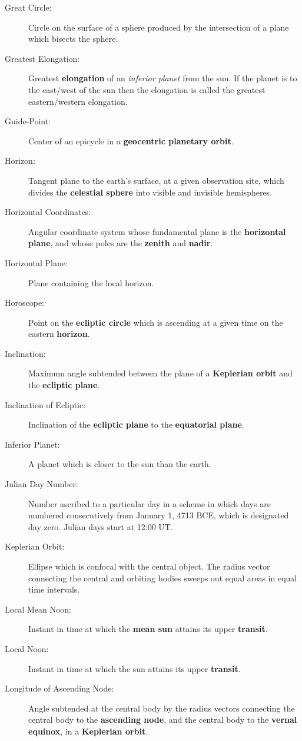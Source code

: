 {\begin{description}
\item [Great Circle:] Circle on the surface of a sphere produced by the intersection of a plane
which bisects the sphere.
\item[Greatest Elongation:] Greatest {\bf elongation}\/ of an {\em inferior planet}\/ from the sun. If the planet is to the east/west of the sun then the
elongation is called the greatest eastern/western elongation. 
\item [Guide-Point:] Center of an epicycle in a {\bf geocentric
planetary orbit}. 
\item [Horizon:] Tangent plane to the earth's surface, at a given
observation site, which divides the {\bf celestial sphere}\/ into
visible and invisible hemispheres. 
\item [Horizontal Coordinates:] Angular coordinate system whose fundamental
plane is the
{\bf horizontal plane}, and whose poles are the {\bf zenith} and {\bf nadir}. 
\item[Horizontal Plane:] Plane containing the local horizon.
\item[Horoscope:] Point on the {\bf ecliptic circle}\/ which is ascending
at a given time
on the eastern {\bf horizon}.
\item[Inclination:] Maximum angle subtended between the plane of
a {\bf Keplerian orbit}\/ and the {\bf ecliptic plane}.
\item[Inclination of Ecliptic:] Inclination of the {\bf ecliptic plane}\/
to the {\bf equatorial plane}. 
\item[Inferior Planet:] A planet which is closer to the sun than the earth. 
\item[Julian Day Number:] Number ascribed to a particular day in a
scheme in which days are numbered consecutively from January
1, 4713 BCE, which is designated day zero. Julian days start at
12:00 UT. 
\item [Keplerian Orbit:] Ellipse which
is confocal with the central object. The radius vector
connecting the central and orbiting bodies sweeps out equal
areas in equal time intervals. 
\item [Local Mean Noon:] Instant in time at which the {\bf mean sun}\/
attains its upper {\bf transit}. 
\item[Local Noon:] Instant in time at which the sun attains its
upper {\bf transit}.
\item [Longitude of Ascending Node:] Angle subtended at the central
body by the radius
vectors connecting the central body to the {\bf ascending node}, and the central
body to the {\bf vernal equinox},  in a {\bf Keplerian orbit}.

\end{description}}
